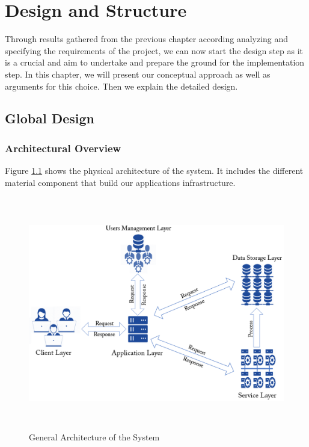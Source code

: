 \chapter{Design and Structure}
\label{Chapter4} 
Through results gathered from the previous chapter according analyzing and specifying the requirements of the project, we can now start the design step as it is a crucial and aim to undertake and prepare the ground for the implementation step. In this chapter, we will present our conceptual approach as well as arguments for this choice. Then we explain the detailed design.
\section{Global Design}


\subsection{Architectural Overview}
 
Figure \ref{phy} shows the physical architecture of the system. It includes the different material component that build our applications infrastructure.  
 ~\\
\begin{figure}[!ht]
\begin{center}
\includegraphics[width=17cm,height=10.2cm]{chapter4/fig1.png}
\end{center}
\caption{General Architecture of the System}
\label{phy}
\end{figure}
 
